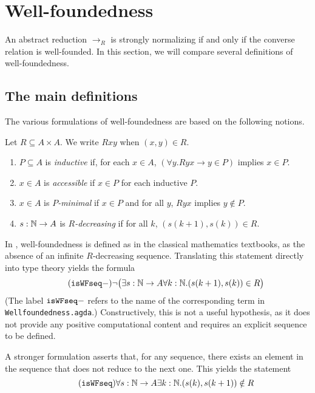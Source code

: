\section{Well-foundedness}



\newcommand{\then}{\Longrightarrow}
\label{sec:Well-foundedness}

An abstract reduction $\to_R$ is strongly normalizing
if and only if the converse relation is well-founded.
In this section, we will compare several definitions of well-foundedness.

\subsection{The main definitions}

The various formulations of well-foundedness are based on the following notions.
\begin{definition}
  Let $R \subseteq A \times A$.  We write $Rxy$ when $(x,y) \in R$.
  \begin{enumerate}
    \item $P \subseteq A$ is \emph{inductive}
    if, for each $x \in A$, $(\forall y. Ryx \to y \in P)$ implies $x \in P$.

    \item $x \in A$ is \emph{accessible} if $x \in P$ for each inductive $P$.

    \item $x \in A$ is \emph{$P$-minimal} if $x \in P$ and for all $y$,
    $Ryx$ implies $y \notin P$.

    \item $s : \mathbb{N} \to A$ is \emph{$R$-decreasing} if for all $k$, $(s(k+1),s(k)) \in R$.
  \end{enumerate}
\end{definition}

In \cite{Terese}, well-foundedness is defined as in the classical mathematics textbooks,
as the absence of an infinite $R$-decreasing sequence.
Translating this statement directly into type theory yields the formula
\[\tag{$\isWFseqm$} \lnot \big(\exists s : \nat \to A \forall k : \nat. (s(k+1),s(k)) \in R \big) \]
(The label $\mathtt{isWFseq-}$ refers to the name of the corresponding term in \texttt{Wellfoundedness.agda}.)
Constructively, this is not a useful hypothesis, as it does not provide any positive computational content and requires an explicit sequence to be defined.

A stronger formulation asserts that, for any sequence, there exists an element
in the sequence that does not reduce to the next one.  This yields the statement
\[\tag{$\isWFseq$} \forall s : \nat \to A \exists k : \nat. (s(k),s(k+1)) \notin R \]

